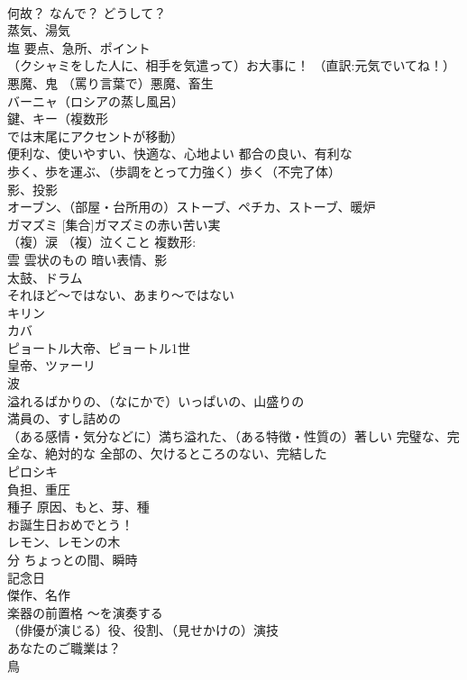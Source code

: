 \documentclass[8pt]{extreport}
\begin{document}
\begin{CJK}{UTF8}{min}
\\	何故？ なんで？ どうして？
\\	蒸気、湯気
\\	塩 要点、急所、ポイント
\\	（クシャミをした人に、相手を気遣って）お大事に！ （直訳:元気でいてね！）
\\	悪魔、鬼 （罵り言葉で）悪魔、畜生
\\	バーニャ（ロシアの蒸し風呂）
\\	鍵、キー（複数形
\\	では末尾にアクセントが移動）
\\	便利な、使いやすい、快適な、心地よい 都合の良い、有利な
\\	歩く、歩を運ぶ、（歩調をとって力強く）歩く（不完了体）
\\	影、投影
\\	オーブン、（部屋・台所用の）ストーブ、ペチカ、ストーブ、暖炉
\\	ガマズミ [集合]ガマズミの赤い苦い実
\\	（複）涙 （複）泣くこと 複数形:
\\	雲 雲状のもの 暗い表情、影
\\	太鼓、ドラム
\\	それほど～ではない、あまり～ではない
\\	キリン
\\	カバ
\\	ピョートル大帝、ピョートル1世
\\	皇帝、ツァーリ
\\	波
\\	溢れるばかりの、（なにかで）いっぱいの、山盛りの 
\\	満員の、すし詰めの 
\\	（ある感情・気分などに）満ち溢れた、（ある特徴・性質の）著しい 完璧な、完全な、絶対的な 全部の、欠けるところのない、完結した
\\	ピロシキ
\\	負担、重圧
\\	種子 原因、もと、芽、種
\\	お誕生日おめでとう！
\\	レモン、レモンの木
\\	分 ちょっとの間、瞬時
\\	記念日
\\	傑作、名作
\\	楽器の前置格	～を演奏する
\\	（俳優が演じる）役、役割、（見せかけの）演技
\\	あなたのご職業は？
\\	鳥

\end{CJK}
\end{document}
